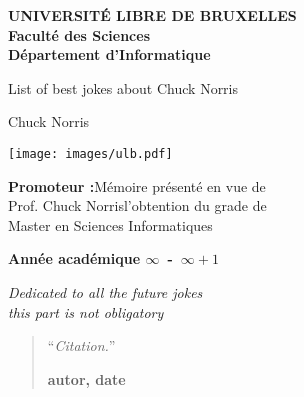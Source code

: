 \documentclass[11pt,a4paper,oneside]{book}
\begin{document}
\frontmatter
\begin{titlepage}
\begin{center}
	\textbf{UNIVERSIT\'E LIBRE DE BRUXELLES}\\
	\textbf{Facult\'e des Sciences}\\
	\textbf{D\'epartement d'Informatique}
	\vfill{}\vfill{}

	{\Huge  List of best jokes about Chuck Norris}

	{\Huge \par}
	\begin{center}{\LARGE Chuck Norris}\end{center}{\Huge \par}
	\vfill{}
	\texttt{[image: images/ulb.pdf]}
	\vfill{}
	\begin{flushright}{\large \textbf{Promoteur :}}\hfill{}{\large M\'emoire pr\'esent\'e en vue de}\\
	{\large Prof. Chuck Norris}\hfill{}{\large l'obtention du grade de}\\
	\hfill{}{\large Master en Sciences Informatiques}\end{flushright}{\large\par}
	\vfill{}\vfill{}\enlargethispage{3cm}
	\textbf{Ann\'ee acad\'emique $\infty$~-~$\infty + 1$}
\end{center}
\end{titlepage}
\newpage
\thispagestyle{empty} 
\null

\newenvironment{vcenterpage}
{\newpage\thispagestyle{empty}
\vspace*{\fill}}
{\vspace*{\fill}\par\pagebreak}

\begin{vcenterpage}
\begin{flushright}
    \large\em\null\vskip1in 
        Dedicated to all the future jokes \\
		this part is not obligatory \vfill
  \end{flushright}
\end{vcenterpage}
\thispagestyle{empty}
\vspace*{5cm}

\begin{quotation}
\noindent ``\emph{Citation.}''
\begin{flushright}\textbf{autor, date}\end{flushright}
\end{quotation}
\end{document}

